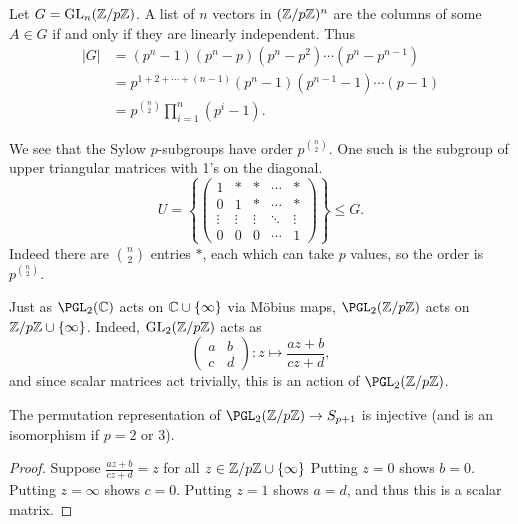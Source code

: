 \documentclass[a4paper]{scrartcl}
\begin{document}
\begin{example}
	Let $G = \operatorname{GL}_n(\mathbb{Z}/p\mathbb{Z})$. A list of $n$ vectors in $(\mathbb{Z}/p\mathbb{Z})^n$ are the columns of some $A \in G$ if and only if they are linearly independent.
	Thus
	\begin{align*}
		|G| &= (p^n - 1)(p^n - p)(p^n - p^2) \cdots (p^n - p^{n - 1}) \\
		&= p^{1 + 2 + \cdots + (n - 1)}(p^n - 1)(p^{n - 1} - 1) \cdots (p - 1) \\
		&= p^{\binom{n}{2}} \prod_{i = 1}^n (p^i - 1).
	\end{align*}

	We see that the Sylow $p$-subgroups have order $p^{\binom{n}{2}}$. One such is the subgroup of upper triangular matrices with 1's on the diagonal.
	$$
	U = \left\{\begin{pmatrix}
		1 & * & * & \cdots & * \\
		0 & 1 & * & \cdots & * \\
		\vdots  &\vdots   & \vdots & \ddots &\vdots \\
		0 & 0 & 0 & \cdots & 1
	\end{pmatrix}\right\} \leq G.
	$$
	Indeed there are $\binom{n}{2}$ entries $*$, each which can take $p$ values, so the order is $p^{\binom{n}{2}}$.
\end{example}

Just as $\PGL_2(\C)$ acts on $\mathbb{C} \cup \{\infty\}$ via Möbius maps, $\PGL_2(\Z/p\Z)$ acts on $\mathbb{Z}/p\mathbb{Z} \cup \{\infty\}$.
Indeed, $\operatorname{GL}_2(\mathbb{Z}/p\mathbb{Z})$ acts as
$$
\begin{pmatrix}
	a & b\\
	c & d
\end{pmatrix}: z \longmapsto \frac{az + b}{cz + d},
$$
and since scalar matrices act trivially, this is an action of $\PGL_2(\Z/p\Z)$.

\begin{lemma}
	The permutation representation of $\PGL_2(\Z/p\Z) \rightarrow S_{p + 1}$ is injective (and is an isomorphism if $p = 2$ or 3).
\end{lemma}
\begin{proof}
	Suppose $\frac{az + b}{cz + d} = z$ for all $z \in \mathbb{Z}/p\mathbb{Z} \cup \{\infty\}$ Putting $z = 0$ shows $b = 0$. Putting $z = \infty$ shows $c = 0$. Putting $z = 1$ shows $a = d$, and thus this is a scalar matrix. 
\end{proof}
\end{document}
